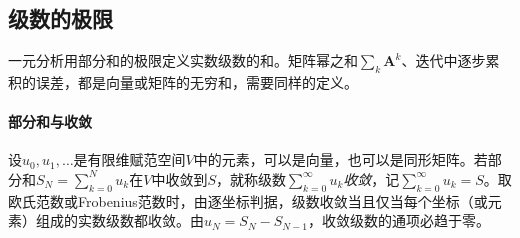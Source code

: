 \subsection{级数的极限}
\label{sec:ls-vector-matrix-series}

一元分析用部分和的极限定义实数级数的和。矩阵幂之和$\sum_k\bm A^k$、迭代中逐步累积的误差，都是向量或矩阵的无穷和，需要同样的定义。

\paragraph{部分和与收敛}
设$u_0,u_1,\ldots$是有限维赋范空间$V$中的元素，可以是向量，也可以是同形矩阵。若部分和$S_N=\sum_{k=0}^Nu_k$在$V$中收敛到$S$，就称级数$\sum_{k=0}^\infty u_k$\emph{收敛}，记$\sum_{k=0}^\infty u_k=S$。取欧氏范数或Frobenius范数时，由逐坐标判据，级数收敛当且仅当每个坐标（或元素）组成的实数级数都收敛。由$u_N=S_N-S_{N-1}$，收敛级数的通项必趋于零。

